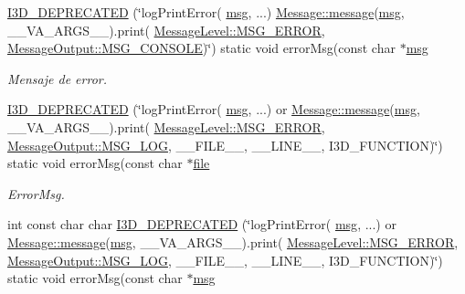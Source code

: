 \begin{DoxyCompactItemize}
\hyperlink{class_i3_d_1_1_log_msg_a45ed30b4fc9701e6cc27d6eb9b197d35}{I3\+D\+\_\+\+D\+E\+P\+R\+E\+C\+A\+T\+ED} (\char`\"{}log\+Print\+Error( \hyperlink{class_i3_d_1_1_log_msg_a5a1ceb27d9529de8eb9b3fc9377e178a}{msg}, ...) \hyperlink{class_i3_d_1_1_message_a525f877a41a1e7493188b2b720d1d254}{Message\+::message}(\hyperlink{class_i3_d_1_1_log_msg_a5a1ceb27d9529de8eb9b3fc9377e178a}{msg}, \+\_\+\+\_\+\+V\+A\+\_\+\+A\+R\+G\+S\+\_\+\+\_\+).print( \hyperlink{namespace_i3_d_a994cd716e000a4023e180dcdb9b3a9c0a5c89a276ac7877e1de49cdc1b4750ce4}{Message\+Level\+::\+M\+S\+G\+\_\+\+E\+R\+R\+OR}, \hyperlink{namespace_i3_d_accba1eafa248ca79da818a0b72e60964ace1cd665ada8b4f22dfa5f764fed6c6c}{Message\+Output\+::\+M\+S\+G\+\_\+\+C\+O\+N\+S\+O\+LE})\char`\"{}) static void error\+Msg(const char $\ast$\hyperlink{class_i3_d_1_1_log_msg_a5a1ceb27d9529de8eb9b3fc9377e178a}{msg}
\begin{DoxyCompactList}\small\item\em Mensaje de error. \end{DoxyCompactList}\item 
\hyperlink{class_i3_d_1_1_log_msg_a3c42ac3ea1b9ceda209394a4181394cf}{I3\+D\+\_\+\+D\+E\+P\+R\+E\+C\+A\+T\+ED} (\char`\"{}log\+Print\+Error( \hyperlink{class_i3_d_1_1_log_msg_a5a1ceb27d9529de8eb9b3fc9377e178a}{msg}, ...) or \hyperlink{class_i3_d_1_1_message_a525f877a41a1e7493188b2b720d1d254}{Message\+::message}(\hyperlink{class_i3_d_1_1_log_msg_a5a1ceb27d9529de8eb9b3fc9377e178a}{msg}, \+\_\+\+\_\+\+V\+A\+\_\+\+A\+R\+G\+S\+\_\+\+\_\+).print( \hyperlink{namespace_i3_d_a994cd716e000a4023e180dcdb9b3a9c0a5c89a276ac7877e1de49cdc1b4750ce4}{Message\+Level\+::\+M\+S\+G\+\_\+\+E\+R\+R\+OR}, \hyperlink{namespace_i3_d_accba1eafa248ca79da818a0b72e60964a8c1a4761ebfadb227927517230ff7b02}{Message\+Output\+::\+M\+S\+G\+\_\+\+L\+OG}, \+\_\+\+\_\+\+F\+I\+L\+E\+\_\+\+\_\+, \+\_\+\+\_\+\+L\+I\+N\+E\+\_\+\+\_\+, I3\+D\+\_\+\+F\+U\+N\+C\+T\+I\+ON)\char`\"{}) static void error\+Msg(const char $\ast$\hyperlink{class_i3_d_1_1_log_msg_ab59f20d39ef112d2196371ae0636d77c}{file}
\begin{DoxyCompactList}\small\item\em Error\+Msg. \end{DoxyCompactList}\item 
int const char char \hyperlink{class_i3_d_1_1_log_msg_a61423345a1ce5d116c573bf7e6d7e1c5}{I3\+D\+\_\+\+D\+E\+P\+R\+E\+C\+A\+T\+ED} (\char`\"{}log\+Print\+Error( \hyperlink{class_i3_d_1_1_log_msg_a5a1ceb27d9529de8eb9b3fc9377e178a}{msg}, ...) or \hyperlink{class_i3_d_1_1_message_a525f877a41a1e7493188b2b720d1d254}{Message\+::message}(\hyperlink{class_i3_d_1_1_log_msg_a5a1ceb27d9529de8eb9b3fc9377e178a}{msg}, \+\_\+\+\_\+\+V\+A\+\_\+\+A\+R\+G\+S\+\_\+\+\_\+).print( \hyperlink{namespace_i3_d_a994cd716e000a4023e180dcdb9b3a9c0a5c89a276ac7877e1de49cdc1b4750ce4}{Message\+Level\+::\+M\+S\+G\+\_\+\+E\+R\+R\+OR}, \hyperlink{namespace_i3_d_accba1eafa248ca79da818a0b72e60964a8c1a4761ebfadb227927517230ff7b02}{Message\+Output\+::\+M\+S\+G\+\_\+\+L\+OG}, \+\_\+\+\_\+\+F\+I\+L\+E\+\_\+\+\_\+, \+\_\+\+\_\+\+L\+I\+N\+E\+\_\+\+\_\+, I3\+D\+\_\+\+F\+U\+N\+C\+T\+I\+ON)\char`\"{}) static void error\+Msg(const char $\ast$\hyperlink{class_i3_d_1_1_log_msg_a5a1ceb27d9529de8eb9b3fc9377e178a}{msg}
\end{DoxyCompactItemize}
